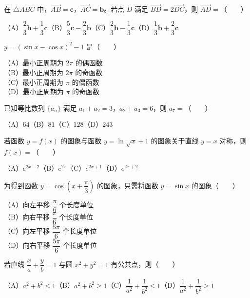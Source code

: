 \begin{question}
在 $\triangle ABC$ 中，$\overrightarrow{AB}=\boldsymbol c$，$\overrightarrow{AC}=\boldsymbol b$。若点 $D$ 满足 $\overrightarrow{BD}=2\overrightarrow{DC}$，则 $\overrightarrow{AD}=$\mbox{（　　）}

（A）$\dfrac23\boldsymbol b+\dfrac13\boldsymbol c$\quad（B）$\dfrac53\boldsymbol c-\dfrac23\boldsymbol b$\quad（C）$\dfrac23\boldsymbol b-\dfrac13\boldsymbol c$\quad（D）$\dfrac13\boldsymbol b+\dfrac23\boldsymbol c$

\end{question}
\begin{question}
$y=(\sin x-\cos x)^2-1$ 是\mbox{（　　）}

（A）最小正周期为 $2\pi$ 的偶函数\\
（B）最小正周期为 $2\pi$ 的奇函数\\
（C）最小正周期为 $\pi$ 的偶函数\\
（D）最小正周期为 $\pi$ 的奇函数

\end{question}
\begin{question}
已知等比数列 $\{a_n\}$ 满足 $a_1+a_2=3$，$a_2+a_3=6$，则 $a_7=$\mbox{（　　）}

（A）$64$\quad（B）$81$\quad（C）$128$\quad（D）$243$

\end{question}
\begin{question}
若函数 $y=f(x)$ 的图象与函数 $y=\ln\sqrt{x}+1$ 的图象关于直线 $y=x$ 对称，则 $f(x)=$\mbox{（　　）}

（A）$e^{2x-2}$\quad（B）$e^{2x}$\quad（C）$e^{2x+1}$\quad（D）$e^{2x+2}$

\end{question}
\begin{question}
为得到函数 $y=\cos\left(x+\dfrac\pi3\right)$ 的图象，只需将函数 $y=\sin x$ 的图象\mbox{（　　）}

（A）向左平移 $\dfrac\pi6$ 个长度单位\\
（B）向右平移 $\dfrac\pi6$ 个长度单位\\
（C）向左平移 $\dfrac{5\pi}6$ 个长度单位\\
（D）向右平移 $\dfrac{5\pi}6$ 个长度单位

\end{question}
\begin{question}
若直线 $\dfrac{x}{a}+\dfrac{y}{b}=1$ 与圆 $x^2+y^2=1$ 有公共点，则\mbox{（　　）}

（A）$a^2+b^2\leqslant1$\quad（B）$a^2+b^2\geqslant1$\quad（C）$\dfrac1{a^2}+\dfrac1{b^2}\leqslant1$\quad（D）$\dfrac1{a^2}+\dfrac1{b^2}\geqslant1$

\end{question}

